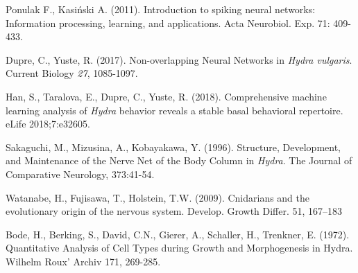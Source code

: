 \documentclass{article}
\begin{document}
\begin{thebibliography}{6}
    Ponulak F., Kasiński A. (2011).
    Introduction to spiking neural networks: Information processing, learning, and applications.
    Acta Neurobiol. Exp. 71: 409-433.
  
    Dupre, C., Yuste, R. (2017). Non-overlapping Neural Networks in \textit{Hydra vulgaris}. Current Biology \textit{27}, 1085-1097.
    
    Han, S., Taralova, E., Dupre, C., Yuste, R. (2018).
    Comprehensive machine learning analysis of \textit{Hydra} behavior reveals a stable basal behavioral repertoire.
    eLife 2018;7:e32605.
    
    Sakaguchi, M., Mizusina, A., Kobayakawa, Y. (1996).
    Structure, Development, and Maintenance of the Nerve Net of the Body Column in \textit{Hydra}.
    The Journal of Comparative Neurology, 373:41-54.
    
    Watanabe, H., Fujisawa, T., Holstein, T.W. (2009).
    Cnidarians and the evolutionary origin of the nervous system.
    Develop. Growth Differ. 51, 167–183
    
    Bode, H., Berking, S., David, C.N., Gierer, A., Schaller, H., Trenkner, E. (1972).
    Quantitative Analysis of Cell Types during Growth and Morphogenesis in Hydra.
    Wilhelm Roux' Archiv 171, 269-285.

\end{thebibliography}
\end{document}
